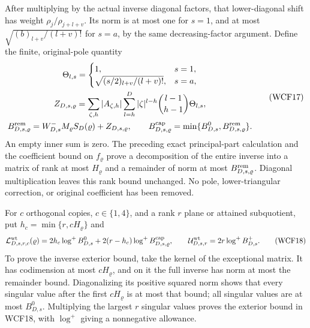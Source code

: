 After multiplying by the actual inverse diagonal factors, that
lower-diagonal shift has weight $\rho_j/\rho_{j+l+v}$. Its norm is
at most one for $s=1$, and at most
$\sqrt{(b)_{l+v}/(l+v)!}$ for $s=a$, by the same decreasing-factor
argument. Define the finite, original-pole quantity
\[
\begin{gathered}
 \Theta_{l,s}=\begin{cases}1,&s=1,\\
       \sqrt{(s/2)_{l+v}/(l+v)!},&s=a,\end{cases}\\
 Z_{D,s,\varrho}=\sum_{\zeta,h}|A_{\zeta,h}|
      \sum_{l=h}^{D}|\zeta|^{l-h}\binom{l-1}{h-1}\Theta_{l,s},\\
 B^{\rm rem}_{D,s,\varrho}=W_{D,s}^-M_\varrho S_D(\varrho)
                              +Z_{D,s,\varrho},\qquad
 B^{\rm cap}_{D,s,\varrho}
     =\min\{B^0_{D,s},B^{\rm rem}_{D,s,\varrho}\}.
\end{gathered}\tag{WCF17}
\]
An empty inner sum is zero. The preceding exact principal-part
calculation and the coefficient bound on $f_\varrho$ prove a decomposition
of the entire inverse into a matrix of rank at most $H_\varrho$ and
a remainder of norm at most $B^{\rm rem}_{D,s,\varrho}$.
Diagonal multiplication leaves this rank bound unchanged. No pole,
lower-triangular correction, or original coefficient has been removed.

For $c$ orthogonal copies, $c\in\{1,4\}$, and a rank $r$ plane or
attained subquotient, put $h_c=\min\{r,cH_\varrho\}$ and
\[
 \mathcal L^{\rm wt}_{D,s,r,c}(\varrho)
 =2h_c\log^+B^0_{D,s}
       +2(r-h_c)\log^+B^{\rm cap}_{D,s,\varrho},\qquad
 \mathcal U^{\rm wt}_{D,s,r}=2r\log^+B^+_{D,s}.
 \tag{WCF18}
\]
To prove the inverse exterior bound, take the kernel of the exceptional
matrix. It has codimension at most $cH_\varrho$, and on it the full
inverse has norm at most the remainder bound. Diagonalizing its positive
squared norm shows that every singular value after the first
$cH_\varrho$ is at most that bound; all singular values are at most
$B^0_{D,s}$. Multiplying the largest $r$ singular values proves the
exterior bound in WCF18, with $\log^+$ giving a nonnegative allowance.

